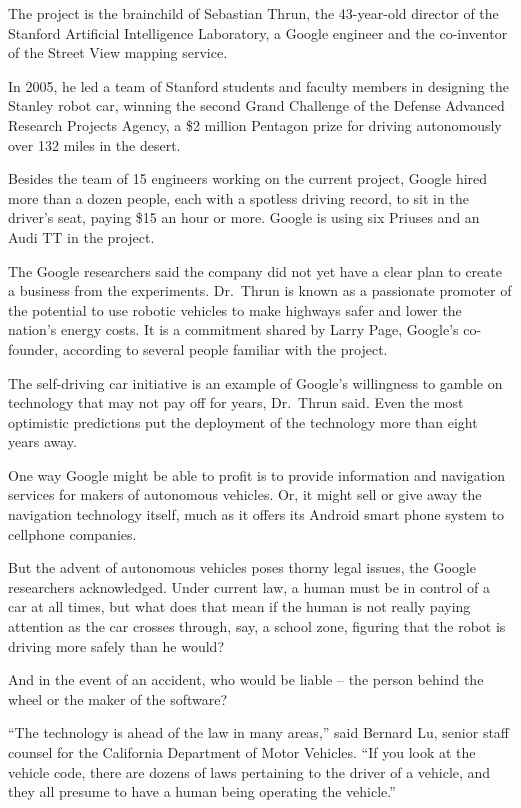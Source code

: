 ﻿\documentclass[12pt]{article}
\begin{document}
The project is the brainchild of Sebastian Thrun, the 43-year-old director of the Stanford
Artificial Intelligence Laboratory, a Google engineer and the co-inventor of the Street View mapping
service.

In 2005, he led a team of Stanford students and faculty members in designing the Stanley robot car,
winning the second Grand Challenge of the Defense Advanced Research Projects Agency, a \$2 million
Pentagon prize for driving autonomously over 132 miles in the desert.

Besides the team of 15 engineers working on the current project, Google hired more than a dozen
people, each with a spotless driving record, to sit in the driver's seat, paying \$15 an hour or
more. Google is using six Priuses and an Audi TT in the project.

The Google researchers said the company did not yet have a clear plan to create a business from the
experiments. Dr.~Thrun is known as a passionate promoter of the potential to use robotic vehicles to
make highways safer and lower the nation's energy costs. It is a commitment shared by Larry Page,
Google's co-founder, according to several people familiar with the project.

The self-driving car initiative is an example of Google's willingness to gamble on technology that
may not pay off for years, Dr.~Thrun said. Even the most optimistic predictions put the deployment
of the technology more than eight years away.

One way Google might be able to profit is to provide information and navigation services for makers
of autonomous vehicles. Or, it might sell or give away the navigation technology itself, much as it
offers its Android smart phone system to cellphone companies.

But the advent of autonomous vehicles poses thorny legal issues, the Google researchers
acknowledged. Under current law, a human must be in control of a car at all times, but what does
that mean if the human is not really paying attention as the car crosses through, say, a school
zone, figuring that the robot is driving more safely than he would?

And in the event of an accident, who would be liable -- the person behind the wheel or the maker of
the software?

``The technology is ahead of the law in many areas,'' said Bernard Lu, senior staff counsel for the
California Department of Motor Vehicles. ``If you look at the vehicle code, there are dozens of laws
pertaining to the driver of a vehicle, and they all presume to have a human being operating the
vehicle.''
\end{document}
